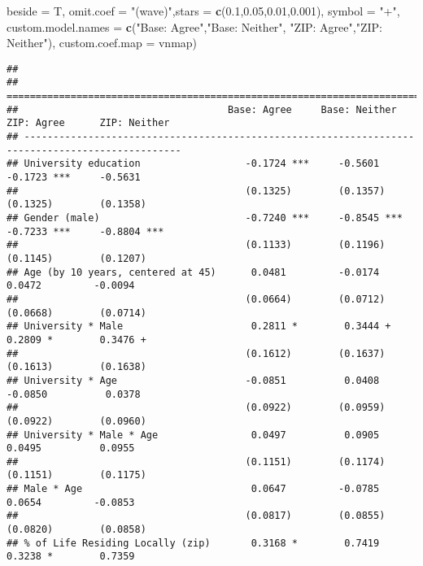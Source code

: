 \documentclass[
]{article}
\newenvironment{Shaded}{\begin{snugshade}}{\end{snugshade}}
\newcommand{\DataTypeTok}[1]{\textcolor[rgb]{0.13,0.29,0.53}{#1}}
\newcommand{\FloatTok}[1]{\textcolor[rgb]{0.00,0.00,0.81}{#1}}
\newcommand{\KeywordTok}[1]{\textcolor[rgb]{0.13,0.29,0.53}{\textbf{#1}}}
\newcommand{\NormalTok}[1]{#1}
\newcommand{\StringTok}[1]{\textcolor[rgb]{0.31,0.60,0.02}{#1}}
\begin{document}
\begin{Shaded}
\begin{Highlighting}[]
          \DataTypeTok{beside =}\NormalTok{ T,}
          \DataTypeTok{omit.coef =} \StringTok{"(wave)"}\NormalTok{,}\DataTypeTok{stars =} \KeywordTok{c}\NormalTok{(}\FloatTok{0.1}\NormalTok{,}\FloatTok{0.05}\NormalTok{,}\FloatTok{0.01}\NormalTok{,}\FloatTok{0.001}\NormalTok{), }\DataTypeTok{symbol =} \StringTok{"+"}\NormalTok{, }
          \DataTypeTok{custom.model.names =} \KeywordTok{c}\NormalTok{(}\StringTok{"Base: Agree"}\NormalTok{,}\StringTok{"Base: Neither"}\NormalTok{,}
                                 \StringTok{"ZIP: Agree"}\NormalTok{,}\StringTok{"ZIP: Neither"}\NormalTok{),}
          \DataTypeTok{custom.coef.map =}\NormalTok{ vnmap)}
\end{Highlighting}
\end{Shaded}

\begin{verbatim}
## 
## =================================================================================================
##                                    Base: Agree     Base: Neither   ZIP: Agree      ZIP: Neither  
## -------------------------------------------------------------------------------------------------
## University education                  -0.1724 ***     -0.5601         -0.1723 ***     -0.5631    
##                                       (0.1325)        (0.1357)        (0.1325)        (0.1358)   
## Gender (male)                         -0.7240 ***     -0.8545 ***     -0.7233 ***     -0.8804 ***
##                                       (0.1133)        (0.1196)        (0.1145)        (0.1207)   
## Age (by 10 years, centered at 45)      0.0481         -0.0174          0.0472         -0.0094    
##                                       (0.0664)        (0.0712)        (0.0668)        (0.0714)   
## University * Male                      0.2811 *        0.3444 +        0.2809 *        0.3476 +  
##                                       (0.1612)        (0.1637)        (0.1613)        (0.1638)   
## University * Age                      -0.0851          0.0408         -0.0850          0.0378    
##                                       (0.0922)        (0.0959)        (0.0922)        (0.0960)   
## University * Male * Age                0.0497          0.0905          0.0495          0.0955    
##                                       (0.1151)        (0.1174)        (0.1151)        (0.1175)   
## Male * Age                             0.0647         -0.0785          0.0654         -0.0853    
##                                       (0.0817)        (0.0855)        (0.0820)        (0.0858)   
## % of Life Residing Locally (zip)       0.3168 *        0.7419          0.3238 *        0.7359    

\end{verbatim}
\end{document}
